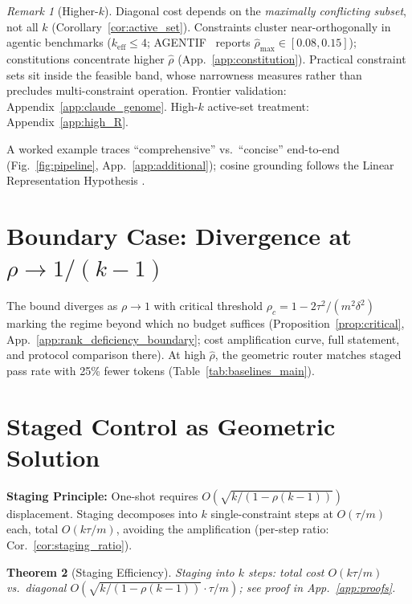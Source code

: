 \documentclass{article}
\theoremstyle{plain}
\newtheorem{theorem}{Theorem}[section]
\theoremstyle{definition}
\theoremstyle{remark}
\newtheorem{remark}[theorem]{Remark}
\newcommand{\rhohat}{\hat{\rho}}
\newcommand{\appref}[1]{App.~\ref{#1}}
\begin{document}
\begin{remark}[Higher-$k$]\label{rem:higher_k}
Diagonal cost depends on the \emph{maximally conflicting subset}, not all $k$ (Corollary~\ref{cor:active_set}). Constraints cluster near-orthogonally in agentic benchmarks ($k_{\text{eff}} \le 4$; AGENTIF~\citep{qi2025agentif} reports $\rhohat_{\max} \in [0.08, 0.15]$); constitutions concentrate higher $\rhohat$ (App.~\ref{app:constitution}). Practical constraint sets sit inside the feasible band, whose narrowness measures rather than precludes multi-constraint operation. Frontier validation: Appendix~\ref{app:claude_genome}. High-$k$ active-set treatment: Appendix~\ref{app:high_R}.
\end{remark}

A worked example traces ``comprehensive'' vs.\ ``concise'' end-to-end (Fig.~\ref{fig:pipeline}, App.~\ref{app:additional}); cosine grounding follows the Linear Representation Hypothesis \citep{park2023linear}.

\section{Boundary Case: Divergence at $\rho \to 1/(k{-}1)$}\label{sec:boundary}

The bound diverges as $\rho \to 1$ with critical threshold $\rho_c = 1 - 2\tau^2/(m^2\delta^2)$ marking the regime beyond which no budget suffices (Proposition~\ref{prop:critical}, \appref{app:rank_deficiency_boundary}; cost amplification curve, full statement, and protocol comparison there). At high $\rhohat$, the geometric router matches staged pass rate with 25\% fewer tokens (Table~\ref{tab:baselines_main}).

\section{Staged Control as Geometric Solution}\label{sec:staging}

\noindent\textbf{Staging Principle:} One-shot requires $O(\sqrt{k/(1{-}\rho(k{-}1))})$ displacement. Staging decomposes into $k$ single-constraint steps at $O(\tau/m)$ each, total $O(k\tau/m)$, avoiding the amplification (per-step ratio: Cor.~\ref{cor:staging_ratio}).

\begin{theorem}[Staging Efficiency]\label{thm:staging}
Staging into $k$ steps: total cost $O(k\tau/m)$ vs.\ diagonal $O(\sqrt{k/(1{-}\rho(k{-}1))}\cdot\tau/m)$; see proof in \appref{app:proofs}.
\end{theorem}
\end{document}
